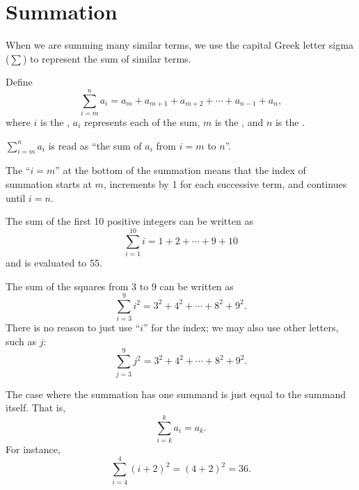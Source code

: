\section{Summation}
When we are summing many similar terms, we use the capital Greek letter sigma ($\sum$) to represent the sum of similar terms.
\begin{definition}
    Define
    \[
        \sum_{i=m}^{n}a_i = a_m + a_{m+1} + a_{m+2} + \cdots + a_{n-1} + a_n,
    \]
    where $i$ is the , $a_i$ represents each  of the sum, $m$ is the , and $n$ is the .
\end{definition}
\begin{remark}
    $\displaystyle \sum_{i=m}^{n}a_i$ is read as ``the sum of $a_i$ from $i=m$ to $n$''.
\end{remark}
\begin{remark}
    The ``$i = m$'' at the bottom of the summation means that the index of summation starts at $m$, increments by 1 for each successive term, and continues until $i = n$.
\end{remark}

\begin{example}
    The sum of the first 10 positive integers can be written as
    \[
        \sum_{i=1}^{10}i = 1 + 2 + \cdots + 9 + 10
    \]
    and is evaluated to 55.
\end{example}

\begin{example}
    The sum of the squares from 3 to 9 can be written as
    \[
        \sum_{i=3}^{9}i^2 = 3^2 + 4^2 + \cdots + 8^2 + 9^2.
    \]
    There is no reason to just use ``$i$'' for the index; we may also use other letters, such as $j$:
    \[
        \sum_{j=3}^{9}j^2 = 3^2 + 4^2 + \cdots + 8^2 + 9^2.
    \]
\end{example}

\begin{example}
    The case where the summation has one summand is just equal to the summand itself. That is,
    \[
        \sum_{i=k}^{k}a_i = a_k.
    \]
    For instance,
    \[
        \sum_{i=4}^4(i+2)^2 = (4+2)^2 = 36.
    \]
\end{example}

